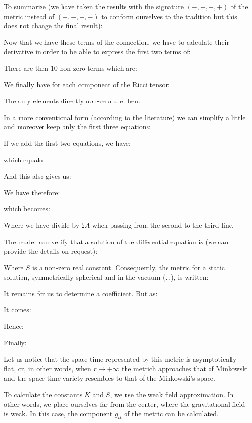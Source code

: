 	
	
	
	
	
	
	
	
	
	
	
	
	
	
	
	
	To summarize (we have taken the results with the signature $(-, +, +, +)$ of the metric instead of $(+, -, -, -)$ to conform ourselves to the tradition but this does not change the final result):
	
	Now that we have these terms of the connection, we have to calculate their derivative in order to be able to express the first two terms of:
	
	There are then $10$ non-zero terms which are:
	
	We finally have for each component of the Ricci tensor:
	
	The only elements directly non-zero are then:
	
	In a more conventional form (according to the literature) we can simplify a little and moreover keep only the first three equations:
	
	If we add the first two equations, we have:
	
	which equals:
	
	And this also gives us:
	
	We have therefore:
	
	which becomes:
	
	Where we have divide by $2A$ when passing from the second to the third line.

	The reader can verify that a solution of the differential equation is (we can provide the details on request):
	
	Where $S$ is a non-zero real constant. Consequently, the metric for a static solution, symmetrically spherical and in the vacuum (...), is written:
	
	It remains for us to determine a coefficient. But as:
	
	It comes:
	
	Hence:
	
	Finally:
	
	Let us notice that the space-time represented by this metric is asymptotically flat, or, in other words, when $r\rightarrow +\infty$ the metrich approaches that of Minkowski and the space-time variety resembles to that of the Minkowski's space.

	To calculate the constants $K$ and $S$, we use the weak field approximation. In other words, we place ourselves far from the center, where the gravitational field is weak. In this case, the component $g_{tt}$ of the metric can be calculated.

